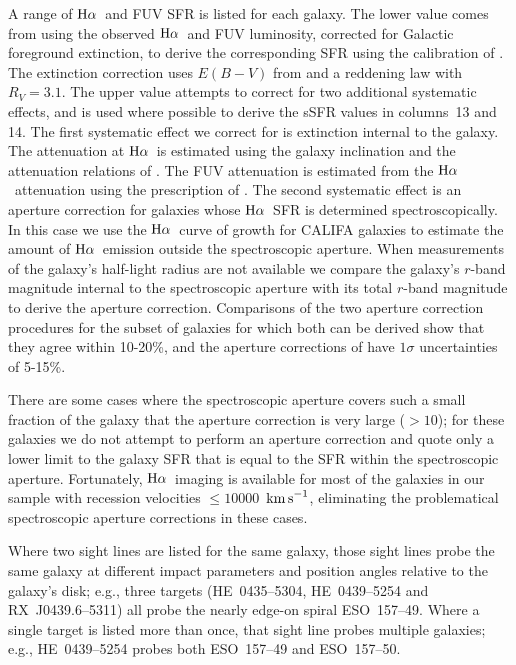 \documentclass[twocolumn,twocolappendix,tighten,times]{aastex6}
\newcommand{\Ha}{\ensuremath{{\rm H}\alpha}}
\newcommand{\kms}{\ensuremath{{\rm km\,s}^{-1}}}
\begin{document}
A range of \Ha\ and FUV SFR is listed for each galaxy. The lower value
comes from using the observed \Ha\ and FUV luminosity, corrected for
Galactic foreground extinction, to derive the corresponding SFR using
the calibration of \citet{hunter10}. The extinction correction uses
$E(B-V)$  from \citet{schlafly11} and a \citet{fitzpatrick99}
reddening law with $R_V=3.1$. The upper value attempts to
correct for two additional systematic effects, and is used where possible 
to derive the sSFR values in columns~13 and 14. The first systematic effect 
we correct for is extinction internal to the galaxy. The attenuation at \Ha\ 
is estimated using the galaxy inclination \citep[derived from the galaxy's 
observed axial ratio using the intrinsic  axial ratios for different 
morphological types of][]{masters10} and the attenuation relations of 
\citet{driver08}. The FUV attenuation is estimated from the \Ha\ attenuation 
using the prescription of \citet{calzetti01}. The second systematic effect 
is an aperture correction for galaxies whose \Ha\ SFR is determined 
spectroscopically. In this case we use the \Ha\ curve of growth for CALIFA 
galaxies \citep{iglesias-paramo13} to estimate the amount of \Ha\ emission 
outside the spectroscopic aperture. When measurements of the galaxy's 
half-light radius are not available we compare the galaxy's $r$-band 
magnitude internal to the spectroscopic aperture with its total $r$-band 
magnitude to derive the aperture correction. Comparisons of the two aperture 
correction procedures for the subset of galaxies for which both can 
be derived show that they agree within 10-20\%, and the aperture
corrections of \citet{iglesias-paramo13} have $1\sigma$ uncertainties 
of 5-15\%. 

There are some cases where the spectroscopic aperture covers 
such a small fraction of the galaxy that the aperture correction is very 
large ($>10$); for these galaxies we do not attempt to perform an aperture 
correction and quote only a lower limit to the galaxy SFR that is equal to 
the SFR within the spectroscopic aperture. Fortunately, \Ha\ imaging is available 
for most of the galaxies in our sample with recession velocities $\leq10000$~\kms, 
eliminating the problematical spectroscopic aperture corrections in these cases.

Where two sight lines are listed for the same galaxy, those sight
lines probe the same galaxy at different impact parameters and
position angles relative to the galaxy's disk; e.g., three targets
(HE~0435--5304, HE~0439--5254 and RX~J0439.6--5311) all probe the
nearly edge-on spiral ESO~157--49. Where a single target is listed
more than once, that sight line probes multiple galaxies; e.g., HE~0439--5254 
probes both ESO~157--49 and ESO~157--50.
\end{document}
